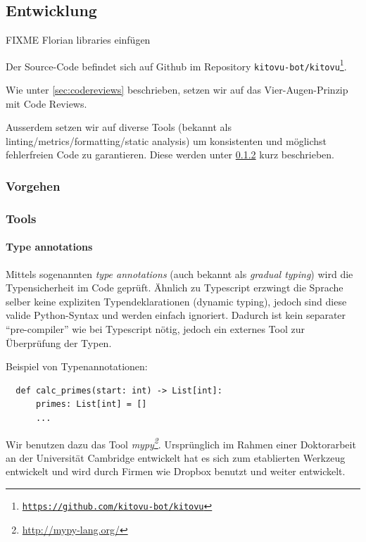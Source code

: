 \documentclass[a4paper]{article}
\begin{document}
\subsection{Entwicklung}

FIXME Florian libraries einfügen

Der Source-Code befindet sich auf Github im Repository \texttt{kitovu-bot/kitovu\footnote{\url{https://github.com/kitovu-bot/kitovu}}}.

Wie unter \ref{sec:codereviews} beschrieben, setzen wir auf das
Vier-Augen-Prinzip mit Code Reviews.

Ausserdem setzen wir auf diverse Tools (bekannt als
linting/metrics/formatting/static analysis) um konsistenten und möglichst
fehlerfreien Code zu garantieren. Diese werden unter \ref{sec:tools} kurz beschrieben.

\subsubsection{Vorgehen}

\subsubsection{Tools}
\label{sec:tools}

\paragraph{Type annotations} Mittels sogenannten \emph{type annotations} (auch
bekannt als \emph{gradual typing}) wird die Typensicherheit im Code geprüft.
Ähnlich zu Typescript erzwingt die Sprache selber keine expliziten
Typendeklarationen (dynamic typing), jedoch sind diese valide Python-Syntax und
werden einfach ignoriert. Dadurch ist kein separater ``pre-compiler'' wie bei
Typescript nötig, jedoch ein externes Tool zur Überprüfung der Typen.

Beispiel von Typenannotationen:

\begin{verbatim}
  def calc_primes(start: int) -> List[int]:
      primes: List[int] = []
      ...
\end{verbatim}

Wir benutzen dazu das Tool \emph{mypy\footnote{\url{http://mypy-lang.org/}}}.
Ursprünglich im Rahmen einer Doktorarbeit an der Universität Cambridge
entwickelt hat es sich zum etablierten Werkzeug entwickelt und wird durch Firmen
wie Dropbox benutzt und weiter entwickelt.
\end{document}
